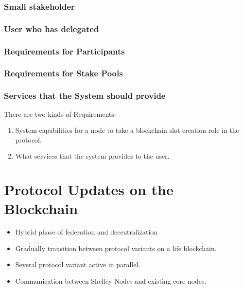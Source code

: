 \documentclass{report}
\theoremstyle{definition}{
  \newtheorem{lemma}{Lemma}[section] %
  \newtheorem{definition}[lemma]{Definition}
}
\theoremstyle{theorem}{
  \newtheorem{invariant}[lemma]{Invariant}
  \newtheorem{proofobligation}[lemma]{Proof Obligation}
}
\numberwithin{equation}{lemma}
\begin{document}
\subsubsection{Small stakeholder}
\subsubsection{User who has delegated}
\subsubsection{Requirements for Participants}
\subsubsection{Requirements for Stake Pools}
\subsubsection{Services that the System should provide}

There are two kinds of Requirements:

\begin{enumerate}
\item System capabilities for a node to take a blockchain slot creation role in the protocol.
\item What services that the system provides to the user.
\end{enumerate}



\section{Protocol Updates on the Blockchain}
\begin{itemize}
\item Hybrid phase of federation and decentralization
\item Gradually transition between protocol variants on a life blockchain.
\item Several protocol variant active in parallel.
\item Communication between Shelley Nodes and existing core nodes.
\end{itemize}
\end{document}
